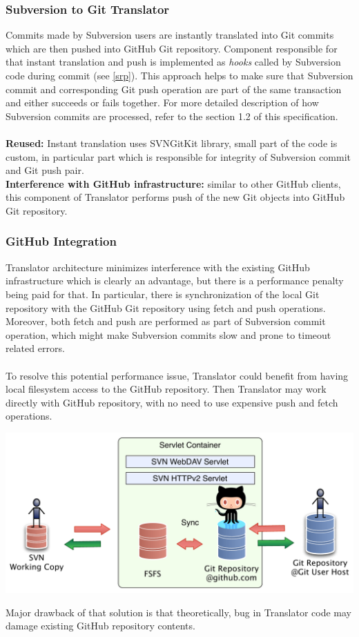 \subsubsection{Subversion to Git Translator}
Commits made by Subversion users are instantly translated into Git commits which are then pushed into GitHub Git repository. Component responsible 
for that instant translation and push is implemented as \emph{hooks} called by Subversion code during commit (see \ref{srp}).
\newpage 
This approach helps to make sure that Subversion commit and corresponding Git push operation are part of the same transaction and either succeeds or fails together.
For more detailed description of how Subversion commits are processed, refer to the section 1.2 of this specification.
\\\\
\textbf{Reused:} Instant translation uses SVNGitKit library, small part of the code is custom, in particular part which is responsible for integrity of Subversion commit and Git push pair.\\
\textbf{Interference with GitHub infrastructure:} similar to other GitHub clients, this component of Translator performs push of the new Git objects into GitHub Git repository. 

\subsubsection{GitHub Integration}

Translator architecture minimizes interference with the existing GitHub infrastructure which is clearly an advantage, but there is a performance penalty being paid for that.
In particular, there is synchronization of the local Git repository with the GitHub Git repository using fetch and push operations. Moreover, both fetch and push are 
performed as part of Subversion commit operation, which might make Subversion commits slow and prone to timeout related errors.
\\\\
To resolve this potential performance issue, Translator could benefit from having local filesystem access to the GitHub repository. Then Translator may work directly with GitHub repository,
with no need to use expensive push and fetch operations.
\begin{center}
\includegraphics[width=\textwidth]{img/servlet/components_not_that_safe.pdf}%
\label{translator_components_pic2}%
\end{center}

Major drawback of that solution is that theoretically, bug in Translator code may damage existing GitHub repository contents.